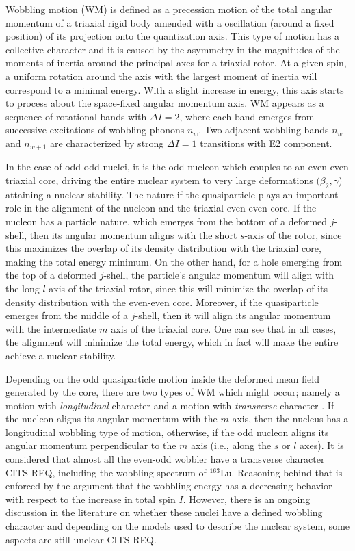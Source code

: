 \documentclass[%
 reprint,
 amsmath,
 amssymb,
 aps,
]{revtex4-2}
\begin{document}
Wobbling motion (WM) is defined as a precession motion of the total angular momentum of a triaxial rigid body amended with a oscillation (around a fixed position) of its projection onto the quantization axis. This type of motion has a collective character and it is caused by the asymmetry in the magnitudes of the moments of inertia around the principal axes for a triaxial rotor. At a given spin, a uniform rotation around the axis with the largest moment of inertia will correspond to a minimal energy. With a slight increase in energy, this axis starts to process about the space-fixed angular momentum axis. WM appears as a sequence of rotational bands with $\Delta I=2$, where each band emerges from successive excitations of wobbling phonons $n_w$. Two adjacent wobbling bands $n_w$ and $n_{w+1}$ are characterized by strong $\Delta I=1$ transitions with E2 component.

In the case of odd-odd nuclei, it is the odd nucleon which couples to an even-even triaxial core, driving the entire nuclear system to very large deformations $(\beta_2,\gamma$) attaining a nuclear stability. The nature if the quasiparticle plays an important role in the alignment of the nucleon and the triaxial even-even core. If the nucleon has a particle nature, which emerges from the bottom of a deformed $j$-shell, then its angular momentum aligns with the short $s$-axis of the rotor, since this maximizes the overlap of its density distribution with the triaxial core, making the total energy minimum. On the other hand, for a hole emerging from the top of a deformed $j$-shell, the particle's angular momentum will align with the long $l$ axis of the triaxial rotor, since this will minimize the overlap of its density distribution with the even-even core. Moreover, if the quasiparticle emerges from the middle of a $j$-shell, then it will align its angular momentum with the intermediate $m$ axis of the triaxial core. One can see that in all cases, the alignment will minimize the total energy, which in fact will make the entire achieve a nuclear stability.

Depending on the odd quasiparticle motion inside the deformed mean field generated by the core, there are two types of WM which might occur; namely a motion with \emph{longitudinal} character and a motion with \emph{transverse} character \cite{frauendorf2014transverse}. If the nucleon aligns its angular momentum with the $m$ axis, then the nucleus has a longitudinal wobbling type of motion, otherwise, if the odd nucleon aligns its angular momentum perpendicular to the $m$ axis (i.e., along the $s$ or $l$ axes). It is considered that almost all the even-odd wobbler have a transverse character {\color{red}CITS REQ}, including the wobbling spectrum of $^{163}$Lu. Reasoning behind that is enforced by the argument that the wobbling energy has a decreasing behavior with respect to the increase in total spin $I$. However, there is an ongoing discussion in the literature on whether these nuclei have a defined wobbling character and depending on the models used to describe the nuclear system, some aspects are still unclear {\color{red}CITS REQ}.
\end{document}
